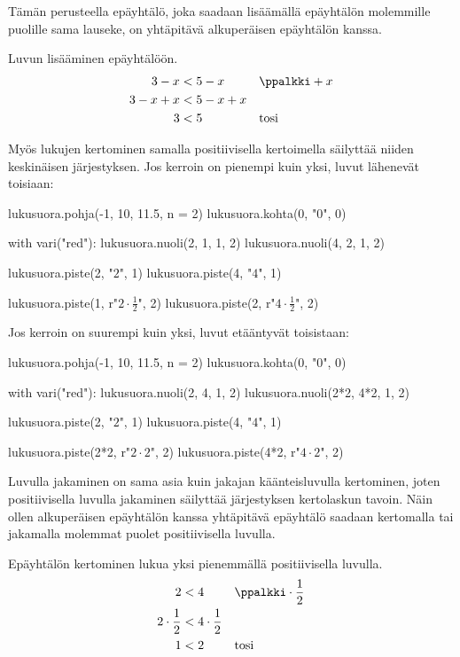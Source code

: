 Tämän perusteella epäyhtälö, joka saadaan lisäämällä epäyhtälön molemmille puolille sama lauseke, on yhtäpitävä alkuperäisen epäyhtälön kanssa.

\begin{esimerkki}
Luvun lisääminen epäyhtälöön.
  \begin{align*}
     3 - x &< 5 - x && \ppalkki +x\\
     3 -x +x &< 5 -x +x \\
     3 &< 5 && \textrm{tosi}
  \end{align*}
\end{esimerkki}

Myös lukujen kertominen samalla positiivisella kertoimella säilyttää niiden keskinäisen järjestyksen. Jos kerroin on pienempi kuin yksi, luvut lähenevät toisiaan:

\begin{kuva}
lukusuora.pohja(-1, 10, 11.5, n = 2)
lukusuora.kohta(0, "$0$", 0)

with vari("red"):
	lukusuora.nuoli(2, 1, 1, 2)
	lukusuora.nuoli(4, 2, 1, 2)

lukusuora.piste(2, "$2$", 1)
lukusuora.piste(4, "$4$", 1)

lukusuora.piste(1, r"$2 \cdot \frac{1}{2}$", 2)
lukusuora.piste(2, r"$4 \cdot \frac{1}{2}$", 2)
\end{kuva}

Jos kerroin on suurempi kuin yksi, luvut etääntyvät toisistaan:

\begin{kuva}
lukusuora.pohja(-1, 10, 11.5, n = 2)
lukusuora.kohta(0, "$0$", 0)

with vari("red"):
	lukusuora.nuoli(2, 4, 1, 2)
	lukusuora.nuoli(2*2, 4*2, 1, 2)

lukusuora.piste(2, "$2$", 1)
lukusuora.piste(4, "$4$", 1)

lukusuora.piste(2*2, r"$2 \cdot 2$", 2)
lukusuora.piste(4*2, r"$4 \cdot 2$", 2)
\end{kuva}

Luvulla jakaminen on sama asia kuin jakajan käänteisluvulla kertominen, joten positiivisella luvulla jakaminen säilyttää järjestyksen kertolaskun tavoin. Näin ollen alkuperäisen epäyhtälön kanssa yhtäpitävä epäyhtälö saadaan kertomalla tai jakamalla molemmat puolet positiivisella luvulla.

\begin{esimerkki}
Epäyhtälön kertominen lukua yksi pienemmällä positiivisella luvulla.
\begin{align*}
     2 &< 4 && \ppalkki \cdot \frac{1}{2} \\
   2\cdot\frac{1}{2} &< 4\cdot\frac{1}{2}  \\
     1 &< 2 && \textrm{tosi}
\end{align*}
\end{esimerkki}

